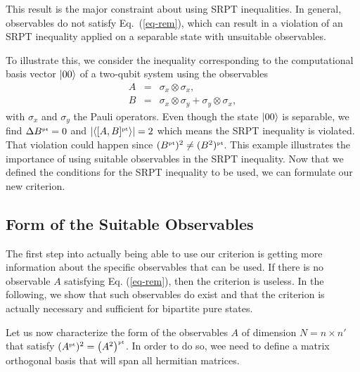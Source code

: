 This result is the major constraint about using SRPT inequalities. In general, observables do not  satisfy Eq.~(\ref{eq-rem}), which can result in a violation of an SRPT inequality applied on a separable state with unsuitable observables.

To illustrate this, we consider the inequality corresponding to the computational basis vector $| 00 \rangle$ of a two-qubit system using the observables
\begin{eqnarray}
  A &=& \sigma_x\otimes\sigma_x, \\
  B &=& \sigma_x \otimes \sigma_y +  \sigma_y \otimes \sigma_x,
\end{eqnarray}
with $\sigma_x$ and $\sigma_y$ the Pauli operators. Even though the state $| 00 \rangle$ is separable, we find $\Delta B^{\mbox{\tiny \textup{pt}}} =0$ and $|\langle [A,B]^{\mbox{\tiny \textup{pt}}} \rangle|=2$ which means the SRPT inequality is violated. That violation could happen since $(B^{\mbox{\tiny \textup{pt}}})^2 \neq (B^2)^{\mbox{\tiny \textup{pt}}}$. This example illustrates the importance of using suitable observables in the SRPT inequality. Now that we defined the conditions for the SRPT inequality to be used, we can formulate our new criterion.


\subsection{Form of the Suitable Observables}

The first step into actually being able to use our criterion is getting more information about the specific observables that can be used. If there is no observable $A$ satisfying Eq. (\ref{eq-rem}), then the criterion is useless. In the following, we show that such observables do exist and that the criterion is actually necessary and sufficient for bipartite pure states.

Let us now characterize the form of the observables $A$ of dimension $N=n\times n'$ that satisfy $(A^{\mbox{\tiny \textup{pt}}})^2 = \left(A^2 \right)^{\mbox{\tiny \textup{pt}}}$. In order to do so, wee need to define a matrix orthogonal basis that will span all hermitian matrices.

